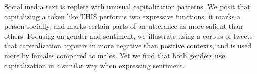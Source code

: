 Social media text is replete with unusual capitalization patterns. We posit that capitalizing a token like THIS performs two expressive functions: it marks a person socially, and marks certain parts of an utterance as more salient than others. Focusing on gender and sentiment, we illustrate using a corpus of tweets that capitalization appears in more negative than positive contexts, and is used more by females compared to males. Yet we find that both genders use capitalization in a similar way when expressing sentiment.
